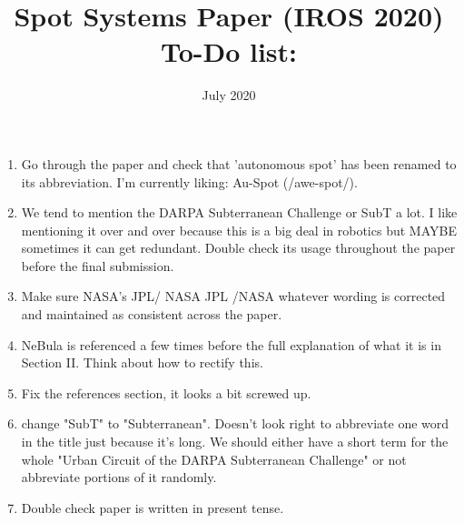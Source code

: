 \documentclass{article}
\title{Spot Systems Paper (IROS 2020) To-Do list:}
\author{}
\date{July 2020}
\begin{document}
\maketitle
\begin{enumerate}
  \item Go through the paper and check that 'autonomous spot' has been renamed to its abbreviation. I'm currently liking: Au-Spot (/awe-spot/).
  \item We tend to mention the DARPA Subterranean Challenge or SubT a lot. I like mentioning it over and over because this is a big deal in robotics but MAYBE sometimes it can get redundant. Double check its usage throughout the paper before the final submission.
  \item Make sure NASA's JPL/ NASA JPL /NASA whatever wording is corrected and maintained as consistent across the paper.
  \item NeBula is referenced a few times before the full explanation of what it is in Section II. Think about how to rectify this. 
  \item Fix the references section, it looks a bit screwed up.
  \item change "SubT" to "Subterranean". Doesn't look right to abbreviate one word in the title just because it's long. We should either have a short term for the whole "Urban Circuit of the DARPA Subterranean Challenge" or not abbreviate portions of it randomly.
  \item Double check paper is written in present tense. 
\end{enumerate}


















\end{document}

